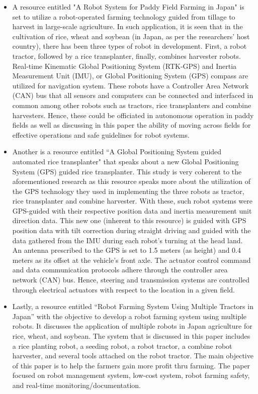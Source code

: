 \begin{itemize}
\item A resource entitled "A Robot System for Paddy Field Farming in Japan" is set to utilize a robot-operated farming technology guided from tillage to harvest in large-scale agriculture. In such application, it is seen that in the cultivation of rice, wheat and soybean (in Japan, as per the researchers' host country), there has been three types of robot in development. First, a robot tractor, followed by a rice transplanter, finally, combines harvester robots. Real-time Kinematic Global Positioning System (RTK-GPS) and Inertia Measurement Unit (IMU), or Global Positioning System (GPS) compass are utilized for navigation system. These robots have a Controller Area Network (CAN) bus that all sensors and computers can be connected and interfaced in common among other robots such as tractors, rice transplanters and combine harvesters. Hence, these could be officiated in autonomous operation in paddy fields as well as discussing in this paper the ability of moving across fields for effective operations and safe guidelines for robot systems.
 
\item Another is a resource entitled “A Global Positioning System guided automated rice transplanter" that speaks about a new Global Positioning System (GPS) guided rice transplanter. This study is very coherent to the aforementioned research as this resource speaks more about the utilization of the GPS technology they used in implementing the three robots as tractor, rice transplanter and combine harvester. With these, such robot systems were GPS-guided with their respective position data and inertia measurement unit direction data. This new one (inherent to this resource) is guided with GPS position data with tilt correction during straight driving and guided with the data gathered from the IMU during each robot's turning at the head land. An antenna prescribed to the GPS is set to 1.5 meters (as height) and 0.4 meters as its offset at the vehicle's front axle. The actuator control command and data communication protocols adhere through the controller area network (CAN) bus. Hence, steering and transmission systems are controlled through electrical actuators with respect to the location in a given field.
 
\item Lastly, a resource entitled “Robot Farming System Using Multiple Tractors in Japan” with the objective to develop a robot farming system using multiple robots. It discusses the application of multiple robots in Japan agriculture for rice, wheat, and soybean. The system that is discussed in this paper includes a rice planting robot, a seeding robot, a robot tractor, a combine robot harvester, and several tools attached on the robot tractor. The main objective of this paper is to help the farmers gain more profit thru farming. The paper focused on robot management system, low-cost system, robot farming safety, and real-time monitoring/documentation.
\end{itemize}




